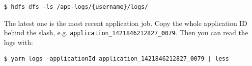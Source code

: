 \documentclass{article}
\begin{document}
\begin{verbatim}
$ hdfs dfs -ls /app-logs/{username}/logs/
\end{verbatim}

The latest one is the most recent application job. Copy the whole application 
ID behind the slash, e.g. \texttt{application\_1421846212827\_0079}. Then you 
can read the logs with:

\begin{verbatim}
$ yarn logs -applicationId application_1421846212827_0079 | less
\end{verbatim}
\end{document}
